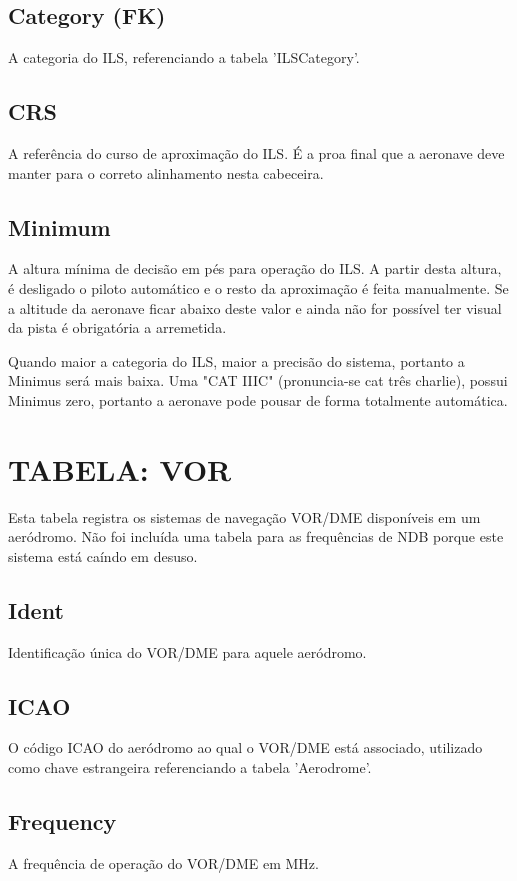 \subsection{Category (FK)}

A categoria do ILS, referenciando a tabela 'ILSCategory'.

\subsection{CRS}

A referência do curso de aproximação do ILS. É a proa final que a aeronave deve 
manter para o correto alinhamento nesta cabeceira.

\subsection{Minimum}

A altura mínima de decisão em pés para operação do ILS. A partir desta altura, é
desligado o piloto automático e o resto da aproximação é feita manualmente.
Se a altitude da aeronave ficar abaixo deste valor e ainda não for possível 
ter visual da pista é obrigatória a arremetida.

Quando maior a categoria do ILS, maior a precisão do sistema, portanto a Minimus 
será mais baixa. Uma "CAT IIIC" (pronuncia-se cat três charlie), possui Minimus zero, 
portanto a aeronave pode pousar de forma totalmente automática.

\section{TABELA: VOR}

Esta tabela registra os sistemas de navegação VOR/DME disponíveis em um aeródromo.
Não foi incluída uma tabela para as frequências de NDB porque este sistema
está caíndo em desuso.

\subsection{Ident}
Identificação única do VOR/DME para aquele aeródromo.

\subsection{ICAO}
O código ICAO do aeródromo ao qual o VOR/DME está associado, utilizado como 
chave estrangeira referenciando a tabela 'Aerodrome'.

\subsection{Frequency}
A frequência de operação do VOR/DME em MHz.